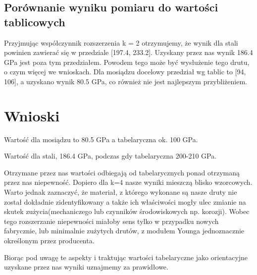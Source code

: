 \documentclass{article}
\begin{document}
\subsection{Porównanie wyniku pomiaru do wartości tablicowych}
Przyjmując współczynnik rozszerzenia k = 2 otrzymujemy, że wynik dla stali powinien zawierać się w przedziale [197.4, 233.2]. Uzyskany przez nas wynik 186.4 GPa jest poza tym przedziałem. Powodem tego może być wysłużenie tego drutu, o czym więcej we wnioskach.
Dla mosiądzu docelowy przedział wg tablic to [94, 106], a uzyskano wynik 80.5 GPa, co również nie jest najlepszym przybliżeniem.
\section{Wnioski}
Wartość dla mosiądzu to 80.5 GPa a tabelaryczna ok. 100 GPa.

Wartość dla stali, 186.4 GPa, podczas gdy tabelaryczna 200-210 GPa.

Otrzymane przez nas wartości odbiegają od tabelarycznych ponad otrzymaną przez nas niepewność. Dopiero dla k=4 nasze wyniki mieszczą blisko wzorcowych. Warto jednak zaznaczyć, że materiał, z którego wykonane są nasze druty nie został dokładnie zidentyfikowany a także ich właściwości mogły ulec zmianie na skutek zużycia(mechaniczego lub czynników środowiskowych np. korozji). Wobec tego rozszerzanie niepewności miałoby sens tylko w przypadku nowych fabrycznie, lub minimalnie zużytych drutów, z modułem Younga jednoznacznie określonym przez producenta.

Biorąc pod uwagę te aspekty i traktując wartości tabelaryczne jako orientacyjne uzyskane przez nas wyniki uznajmemy za prawidłowe.





\end{document}
